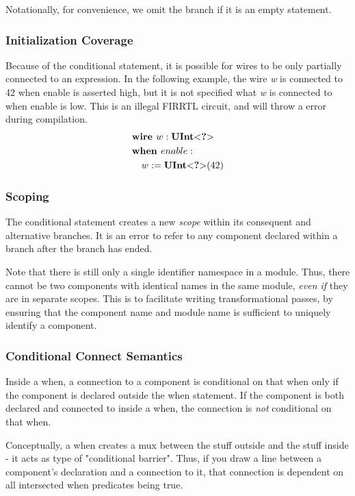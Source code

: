 \documentclass[12pt]{article}
\begin{document}
Notationally, for convenience, we omit the  branch if it is an empty statement. 

\subsubsection{Initialization Coverage}
Because of the conditional statement, it is possible for wires to be only partially connected to an expression.
In the following example, the wire {\em w} is connected to 42 when enable is asserted high, but it is not specified what {\em w} is connected to when enable is low.
This is an illegal FIRRTL circuit, and will throw a  error during compilation.
\[
\begin{aligned}
&\text{\bf wire\ } w : \text{\bf UInt}\text{\bf $<$} \text{\bf ?} \text{\bf $>$} \\
&\text{\bf when\ } enable : \\
&\quad w := \text{\bf UInt}\text{\bf $<$} \text{\bf ?} \text{\bf $>$}(42) \\
\end{aligned}
\]

\subsubsection{Scoping}
The conditional statement creates a new {\em scope} within its consequent and alternative branches.
It is an error to refer to any component declared within a branch after the branch has ended.

Note that there is still only a single identifier namespace in a module.
Thus, there cannot be two components with identical names in the same module, {\em even if} they are in separate scopes.
This is to facilitate writing transformational passes, by ensuring that the component name and module name is sufficient to uniquely identify a component.

\subsubsection{Conditional Connect Semantics}
Inside a when, a connection to a component is conditional on that when only if the component is declared outside the when statement.
If the component is both declared and connected to inside a when, the connection is {\em not} conditional on that when.

Conceptually, a when creates a mux between the stuff outside and the stuff inside - it acts as type of "conditional barrier".
Thus, if you draw a line between a component's declaration and a connection to it, that connection is dependent on all intersected when predicates being true.
\end{document}
